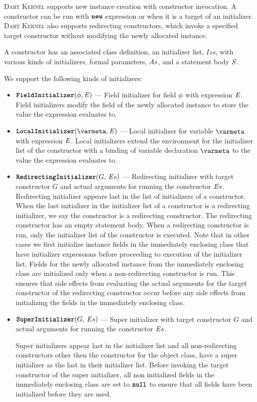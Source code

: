 \documentclass[a4paper,oneside,fleqn]{article}
\newcommand{\kernel}{\textsc{Dart Kernel}}
\newcommand{\synt}[1]{\ensuremath{\text{\textbf{\texttt{#1}}}}}
\DeclareMathOperator{\new}{\synt{new}}
\begin{document}
\kernel{} supports new instance creation with constructor invocation.
A constructor can be run with $\new$ expression or when it is a target of an initializer.
\kernel{} also supports redirecting constructors, which invoke a specified target constructor without modifying the newly allocated instance.

A constructor has an associated class definition, an initializer list, $Izs$, with various kinds of initializers, formal parameters, $As$, and a statement body $\mathit{S}$.

We support the following kinds of initializers:

\begin{itemize}
    \item $\FieldInitializer{\expressionmeta}$ --- Field initializer for field $\phi$ with expression $\mathit{E}$.
        Field initializers modify the field of the newly allocated instance to store the value the expression evaluates to.
    \item $\LocalInitializer{\expressionmeta}$ --- Local initializer for variable $\varmeta$ with expression $\mathit{E}$.
        Local initializers extend the environment for the initializer list of the constructor with a binding of variable declaration $\varmeta$ to the value the expression evaluates to.
    \item $\RedirectingInitializer{G}{\expressionsmeta}$ --- Redirecting initializer with target constructor $G$ and actual arguments for running the constructor $\mathit{E}{s}$.
        Redirecting initializer appears last in the list of initializers of a constructor.
        When the last initializer in the initializer list of a constructor is a redirecting initializer, we say the constructor is a redirecting constructor.
        The redirecting constructor has an empty statement body.
        When a redirecting constructor is run, only the initializer list of the constructor is executed.
        Note that in other cases we first initialize instance fields in the immediately enclosing class that have initializer expressions before proceeding to execution of the initializer list.
        Fields for the newly allocated instance from the immediately enclosing class are initialized only when a non-redirecting constructor is run.
        This ensures that side effects from evaluating the actual arguments for the target constructor of the redirecting constructor occur before any side effects from initializing the fields in the immediately enclosing class.
    \item $\SuperInitializer{G}{\expressionsmeta}$ --- Super initializer with target constructor $G$ and actual arguments for running the constructor $\mathit{E}{s}$.

        Super initializers appear last in the initializer list and all non-redirecting constructors other then the constructor for the object class, have a super initializer as the last in their initializer list.
        Before invoking the target constructor of the super initializer, all non initialized fields in the immediately enclosing class are set to $\NullLiteral$ to ensure that all fields have been initialized before they are used.
\end{itemize}
\end{document}
